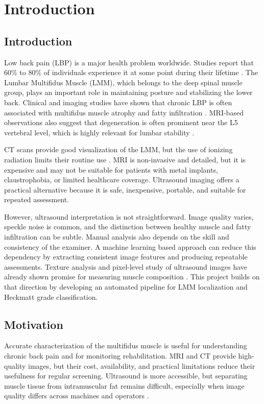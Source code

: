 \chapter{Introduction}
\label{chap:introduction}
\section{Introduction}
\label{intro}
Low back pain (LBP) is a major health problem worldwide. Studies report that 60\% to 80\% of individuals experience it at some point during their lifetime \cite{Freeman2010}. The Lumbar Multifidus Muscle (LMM), which belongs to the deep spinal muscle group, plays an important role in maintaining posture and stabilizing the lower back. Clinical and imaging studies have shown that chronic LBP is often associated with multifidus muscle atrophy and fatty infiltration \cite{Vohra2016}. MRI-based observations also suggest that degeneration is often prominent near the L5 vertebral level, which is highly relevant for lumbar stability \cite{Vohra2016}.

CT scans provide good visualization of the LMM, but the use of ionizing radiation limits their routine use \cite{Brenner2022}. MRI is non-invasive and detailed, but it is expensive and may not be suitable for patients with metal implants, claustrophobia, or limited healthcare coverage. Ultrasound imaging offers a practical alternative because it is safe, inexpensive, portable, and suitable for repeated assessment.

However, ultrasound interpretation is not straightforward. Image quality varies, speckle noise is common, and the distinction between healthy muscle and fatty infiltration can be subtle. Manual analysis also depends on the skill and consistency of the examiner. A machine learning based approach can reduce this dependency by extracting consistent image features and producing repeatable assessments. Texture analysis and pixel-level study of ultrasound images have already shown promise for measuring muscle composition \cite{Pincheira2024}. This project builds on that direction by developing an automated pipeline for LMM localization and Heckmatt grade classification.


\section{Motivation}
\label{motivation}
Accurate characterization of the multifidus muscle is useful for understanding chronic back pain and for monitoring rehabilitation. MRI and CT provide high-quality images, but their cost, availability, and practical limitations reduce their usefulness for regular screening. Ultrasound is more accessible, but separating muscle tissue from intramuscular fat remains difficult, especially when image quality differs across machines and operators \cite{Sions2017}.

